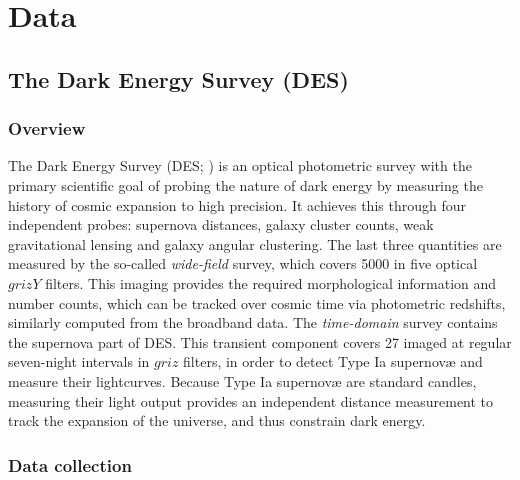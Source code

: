 \section{Data}
\subsection{The Dark Energy Survey (DES)}
\subsubsection{Overview}
The Dark Energy Survey (DES; \citealt{2005IJMPA..20.3121F,2018ApJS..239...18A}) is an optical photometric survey with the primary scientific goal of probing the nature of dark energy by measuring the history of cosmic expansion to high precision. It achieves this through four independent probes: supernova distances, galaxy cluster counts, weak gravitational lensing and galaxy angular clustering. The last three quantities are measured by the so-called \textit{wide-field} survey, which covers \SI{5000}{\sqdeg} in five optical $grizY$ filters. This imaging provides the required morphological information and number counts, which can be tracked over cosmic time via photometric redshifts, similarly computed from the broadband data.  The \textit{time-domain} survey contains the supernova part of DES. This transient component covers \SI{27}{\sqdeg} imaged at regular seven-night intervals in $griz$ filters, in order to detect Type Ia supernov\ae{} and measure their lightcurves. Because Type Ia supernov\ae{} are standard candles, measuring their light output provides an independent distance measurement to track the expansion of the universe, and thus constrain dark energy. \par 



\subsubsection{Data collection}\label{subsubsection:data_collection}

